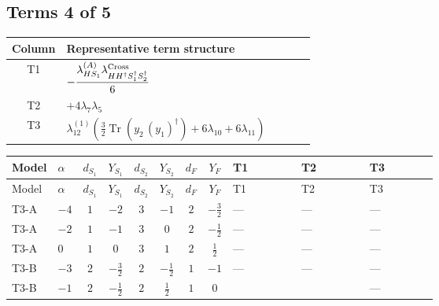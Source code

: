 \documentclass[8pt]{article}
\begin{document}
\begin{landscape}
\subsection*{Terms 4 of 5}
\begin{center}
\begin{tabular}{@{}c >{\raggedright\arraybackslash}p{0.82\linewidth}@{}}
\toprule
Column & Representative term structure \\
\midrule
T1 & \(\displaystyle -\frac{{\lambda_{HS_1}^{(A)}} {\lambda_{H H^\dagger S_1^\dagger S_2^\dagger}^{\rm Cross}}}{6}\) \\
\midrule
T2 & \(\displaystyle +4 {\lambda_{7}} {\lambda_5}\) \\
\midrule
T3 & \(\displaystyle {\lambda_{12}^{(1)}} \left(\frac{3}{2} \operatorname{Tr}\!\left({y_2}\,\left({y_1}\right)^{\dagger}\right)+6 {\lambda_{10}}+6 {\lambda_{11}}\right)\) \\
\midrule
\bottomrule
\end{tabular}
\end{center}
\smallskip
\tiny
\begin{longtable}{@{}llcccccc >{\raggedright\arraybackslash}p{0.21\linewidth} >{\raggedright\arraybackslash}p{0.21\linewidth} >{\raggedright\arraybackslash}p{0.21\linewidth}@{}}
\toprule
Model & $\alpha$ & $d_{S_1}$ & $Y_{S_1}$ & $d_{S_2}$ & $Y_{S_2}$ & $d_F$ & $Y_F$ & T1 & T2 & T3 \\
\midrule
\endfirsthead
\toprule
Model & $\alpha$ & $d_{S_1}$ & $Y_{S_1}$ & $d_{S_2}$ & $Y_{S_2}$ & $d_F$ & $Y_F$ & T1 & T2 & T3 \\
\midrule
\endhead
T3-A & $-4$ & $1$ & $-2$ & $3$ & $-1$ & $2$ & $-\frac{3}{2}$ & --- & --- & --- \\
\midrule
T3-A & $-2$ & $1$ & $-1$ & $3$ & $0$ & $2$ & $-\frac{1}{2}$ & --- & --- & --- \\
\midrule
T3-A & $0$ & $1$ & $0$ & $3$ & $1$ & $2$ & $\frac{1}{2}$ & --- & --- & --- \\
\midrule
T3-B & $-3$ & $2$ & $-\frac{3}{2}$ & $2$ & $-\frac{1}{2}$ & $1$ & $-1$ & --- & --- & --- \\
\midrule
T3-B & $-1$ & $2$ & $-\frac{1}{2}$ & $2$ & $\frac{1}{2}$ & $1$ & $0$ & \scriptsize\adjustbox{max width=\linewidth}{$\begin{gathered} -\frac{{\lambda_{HS_1}^{(A)}} {\lambda_{H H^\dagger S_1^\dagger S_2^\dagger}^{\rm Cross}}}{6}\end{gathered}$} & \scriptsize\adjustbox{max width=\linewidth}{$\begin{gathered} +4 {\lambda_{7}} {\lambda_5}\end{gathered}$} & --- \\

\end{longtable}
\end{landscape}
\end{document}
